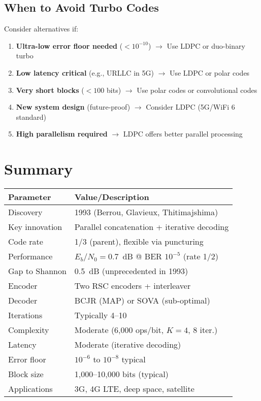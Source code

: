 \subsection{When to Avoid Turbo Codes}

Consider alternatives if:

\begin{enumerate}
\item \textbf{Ultra-low error floor needed} ($< 10^{-10}$) $\rightarrow$ Use LDPC or duo-binary turbo

\item \textbf{Low latency critical} (e.g., URLLC in 5G) $\rightarrow$ Use LDPC or polar codes

\item \textbf{Very short blocks} ($< 100$ bits) $\rightarrow$ Use polar codes or convolutional codes

\item \textbf{New system design} (future-proof) $\rightarrow$ Consider LDPC (5G/WiFi 6 standard)

\item \textbf{High parallelism required} $\rightarrow$ LDPC offers better parallel processing
\end{enumerate}

\section{Summary}

\begin{center}
\begin{tabular}{@{}ll@{}}
\toprule
\textbf{Parameter} & \textbf{Value/Description} \\
\midrule
Discovery & 1993 (Berrou, Glavieux, Thitimajshima) \\
Key innovation & Parallel concatenation + iterative decoding \\
Code rate & 1/3 (parent), flexible via puncturing \\
Performance & $E_b/N_0 = 0.7$~dB @ BER $10^{-5}$ (rate 1/2) \\
Gap to Shannon & 0.5~dB (unprecedented in 1993) \\
Encoder & Two RSC encoders + interleaver \\
Decoder & BCJR (MAP) or SOVA (sub-optimal) \\
Iterations & Typically 4--10 \\
Complexity & Moderate (6,000 ops/bit, $K=4$, 8 iter.) \\
Latency & Moderate (iterative decoding) \\
Error floor & $10^{-6}$ to $10^{-8}$ typical \\
Block size & 1,000--10,000 bits (typical) \\
Applications & 3G, 4G LTE, deep space, satellite \\
\bottomrule
\end{tabular}
\end{center}

